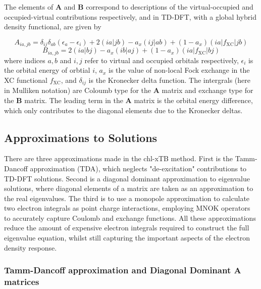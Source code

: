 The elements of $\mathbf{A}$ and $\mathbf{B}$ correspond to descriptions of the
virtual-occupied and occupied-virtual contributions respectively, and in TD-DFT, 
with a global hybrid density functional, are given by

\begin{equation}
A_{ia,jb} = \delta_{ij} \delta_{ab} \left( \epsilon_a - \epsilon_i \right) + 2\left(ia|jb\right) - a_x\left(ij|ab\right) + (1- a_x)\left(ia|f_{\text{XC}}|jb\right)
\end{equation}
%
\begin{equation}
B_{ia,jb} = 2\left(ia|bj\right) - a_x\left(ib|aj\right) + (1- a_x)\left(ia|f_{\text{XC}}|bj\right)
\end{equation}
%
where indices $a,b$ and $i,j$ refer to virtual and occupied orbitals respectively,
$\epsilon_i$ is the orbital energy of orbtial $i$, $a_x$ is the value of non-local
Fock exchange in the XC functional $f_{\text{XC}}$, and $\delta_{ij}$ is the Kronecker
delta function. The intergrals (here in Mulliken notation) are Coloumb type for
the $\mathbf{A}$ matrix and exchange type for the $\mathbf{B}$ matrix. The leading 
term in the $\mathbf{A}$ matrix is the orbital energy difference, which only contributes
to the diagonal elements due to the Kronecker deltas.

\subsection{Approximations to Solutions}
\label{subsec:chl_approxs}

There are three approximations made in the chl-xTB method. First is the Tamm-Dancoff 
approximation (TDA), which neglects "de-excitation" contributions to TD-DFT solutions.
Second is a diagonal dominant approximation to eigenvalue solutions, where diagonal 
elements of a matrix are taken as an approximation to the real eigenvalues. The 
third is to use a monopole approximation to calculate two electron integrals as 
point charge interactions, employing MNOK operators to accurately capture Coulomb
and exchange functions. All these approximations reduce the amount of expensive 
electron integrals required to construct the full eigenvalue equation, whilst still
capturing the important aspects of the electron density response.

\subsubsection{Tamm-Dancoff approximation and Diagonal Dominant $\mathbf{A}$ matrices}
\label{subsubsec:Tamm_Dancoff}

